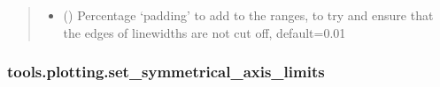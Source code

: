 \documentclass[letterpaper,10pt,english]{sphinxmanual}
\begin{document}
\begin{fulllineitems}
\begin{quote}
\begin{description}
\begin{itemize}
\item {} 
\sphinxAtStartPar
{} (\sphinxstyleliteralemphasis{\sphinxupquote{, }}) \textendash{} Percentage ‘padding’ to add to the ranges, to try and ensure that the edges of linewidths are not cut off,
default=0.01

\end{itemize}

\end{description}\end{quote}

\end{fulllineitems}



\subsubsection{tools.plotting.set\_symmetrical\_axis\_limits}
\label{\detokenize{_autosummary/tools.plotting.set_symmetrical_axis_limits:tools-plotting-set-symmetrical-axis-limits}}\label{\detokenize{_autosummary/tools.plotting.set_symmetrical_axis_limits::doc}}
\end{document}
